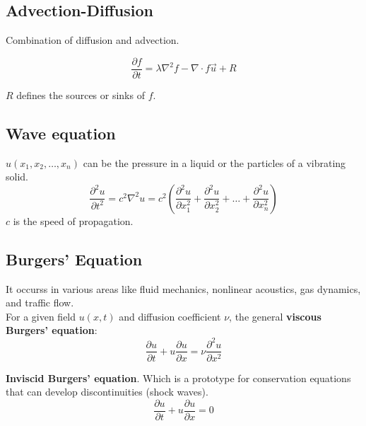 \documentclass[doc]{apa}
\begin{document}
\subsection{\color{blue}Advection-Diffusion}
Combination of diffusion and advection.

\begin{equation}
\frac{\partial f}{\partial t} = \lambda \nabla^2 f - \nabla \cdot f \vec u + R
\end{equation}

$R$ defines the sources or sinks of $f$. 

\subsection{\color{blue}Wave equation}
$u(x_1, x_2, \dots, x_n)$ can be the pressure in a liquid or the particles of a vibrating solid. 
\begin{equation}
    \frac{\partial^2 u}{\partial t^2} = c^2 \nabla^2 u = c^2 \left (
                                        \frac{\partial^2 u}{\partial x^2_1} +
                                        \frac{\partial^2 u}{\partial x^2_2} +
                                        \dots +
                                        \frac{\partial^2 u}{\partial x^2_n} 
                                        \right )
\end{equation}
$c$ is the speed of propagation.
\newpage

\subsection{\color{orange}Burgers' Equation}
It occurss in various areas like fluid mechanics, nonlinear acoustics, gas dynamics, and traffic flow.\\
For a given field $u(x,t)$ and diffusion  coefficient $\nu$, the general \textbf{viscous Burgers' equation}:
\begin{equation}
\frac{\partial u}{\partial t} + u\frac{\partial u}{\partial x} = \nu \frac{\partial^2 u}{\partial x^2}
\end{equation}

\textbf{Inviscid Burgers' equation}. Which is a prototype for conservation equations that can develop discontinuities (shock waves).
\begin{equation}
\frac{\partial u}{\partial t} + u\frac{\partial u}{\partial x} = 0
\end{equation}


\end{document}
